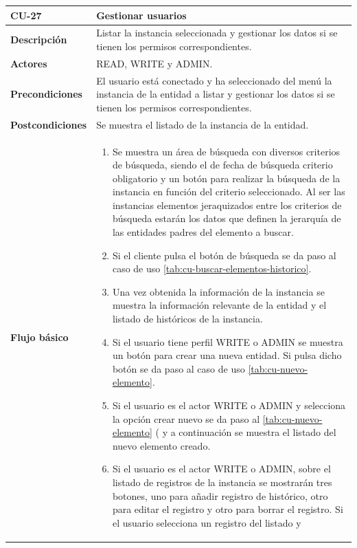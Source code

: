 \begin{table} [H]
    \centering
    \setlength{\leftmargini}{0.4cm}
	\resizebox{14cm}{!} { %
    \begin{tabular}{| m{3cm} | m{11cm} |}   
    \hline
	  \textbf{CU-27} & \textbf{Gestionar usuarios} \\\hline
	  \textbf{Descripción} & Listar la instancia seleccionada y gestionar los datos si se tienen los permisos correspondientes. \\\hline
	  \textbf{Actores} & READ, WRITE y ADMIN. \\\hline
	  \textbf{Precondiciones} & El usuario está conectado y ha seleccionado del menú la instancia de la entidad a listar y gestionar los datos si se tienen los permisos correspondientes. \\\hline
	  \textbf{Postcondiciones} & Se muestra el listado de la instancia de la entidad. \\\hline
	  \textbf{Flujo básico} & 
		\begin{enumerate}
	  	\item Se muestra un área de búsqueda con diversos criterios de búsqueda, siendo el de fecha de búsqueda criterio obligatorio y un botón para realizar la búsqueda de la instancia en función del criterio seleccionado. Al ser las instancias elementos jeraquizados entre los criterios de búsqueda estarán los datos que definen la jerarquía de las entidades padres del elemento a buscar.
	  	\item Si el cliente pulsa el botón de búsqueda se da paso al caso de uso \ref{tab:cu-buscar-elementos-historico}. 
	  	\item Una vez obtenida la información de la instancia se muestra la información relevante de la entidad y el listado de históricos de la instancia.
	  	\item Si el usuario tiene perfil WRITE o ADMIN se muestra un botón para crear una nueva entidad. Si pulsa dicho botón se da paso al caso de uso \ref{tab:cu-nuevo-elemento}.
	  	\item Si el usuario es el actor WRITE o ADMIN y selecciona la opción crear nuevo se da paso al \ref{tab:cu-nuevo-elemento} (\pageref{tab:cu-nuevo-elemento} y a continuación se muestra el listado del nuevo elemento creado.
		\item Si el usuario es el actor WRITE o ADMIN, sobre el listado de registros de la instancia se mostrarán tres botones, uno para añadir registro de histórico, otro para editar el registro y otro para borrar el registro. Si el usuario selecciona un registro del listado y

\end{enumerate}
\end{tabular}}
\end{table}
